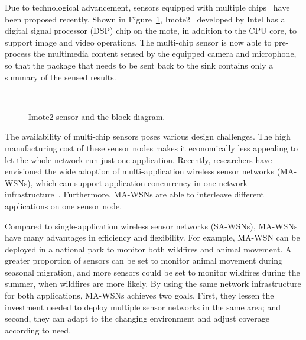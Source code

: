 Due to technological advancement, sensors equipped with multiple chips~\cite{imote2} have been proposed recently. Shown in Figure~\ref{fig:imote2}, Imote2~\cite{imote2} developed by Intel has a digital signal processor (DSP) chip on the mote, in addition to the CPU core, to support image and video operations. The multi-chip sensor is now able to pre-process the multimedia content sensed by the equipped camera and microphone, so that the package that needs to be sent back to the sink contains only a summary of the sensed results.

\begin{figure}[h]
\centering
\mbox{
	\hspace{20mm}
      }
\caption{Imote2 sensor and the block diagram.}
\label{fig:imote2}
\end{figure}

The availability of multi-chip sensors poses various design challenges. The high manufacturing cost of these sensor nodes makes it economically less appealing to let the whole network run just one application. Recently, researchers have envisioned the wide adoption of multi-application wireless sensor networks (MA-WSNs), which can support application concurrency in one network infrastructure~\cite{melete,ma-wsns}. Furthermore, MA-WSNs are able to interleave different applications on one sensor node.

Compared to single-application wireless sensor networks (SA-WSNs), MA-WSNs have many advantages in efficiency and flexibility.
For example, MA-WSN can be deployed in a national park to monitor both wildfires and animal movement. A greater proportion of sensors can be set to monitor animal movement during seasonal migration, and more sensors could be set to monitor wildfires during the summer, when wildfires are more likely. By using the same network infrastructure for both applications, MA-WSNs achieves two goals. First, they lessen the investment needed to deploy multiple sensor networks in the same area; and second, they can adapt to the changing environment and adjust coverage according to need.

